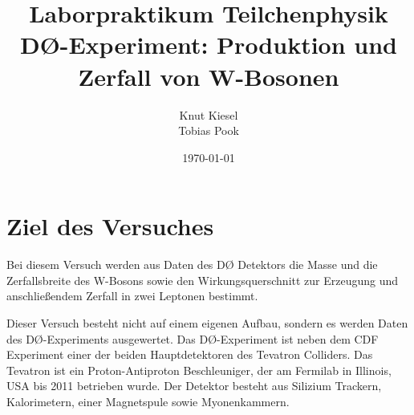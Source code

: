 \documentclass[a4paper,12pt]{article}
\title{Laborpraktikum Teilchenphysik\\ DØ-Experiment: Produktion und Zerfall von W-Bosonen}
\author{Knut Kiesel\\Tobias Pook}
\date{\today}
\begin{document}
\maketitle
\vspace{3cm}
\tableofcontents
\thispagestyle{empty}
\newpage
\setcounter{page}{1}

\section{Ziel des Versuches}
Bei diesem Versuch werden aus Daten des DØ Detektors die Masse und die Zerfallsbreite des W-Bosons
sowie den Wirkungsquerschnitt zur Erzeugung und anschließendem Zerfall in zwei Leptonen bestimmt.

Dieser Versuch besteht nicht auf einem eigenen Aufbau, sondern es werden Daten des DØ-Experiments
ausgewertet. Das DØ-Experiment ist neben dem CDF Experiment einer der beiden Hauptdetektoren des
Tevatron Colliders. Das Tevatron ist ein Proton-Antiproton Beschleuniger, der am Fermilab in
Illinois, USA bis 2011 betrieben wurde. Der Detektor besteht aus Silizium Trackern, Kalorimetern,
einer Magnetspule sowie Myonenkammern.
\end{document}
